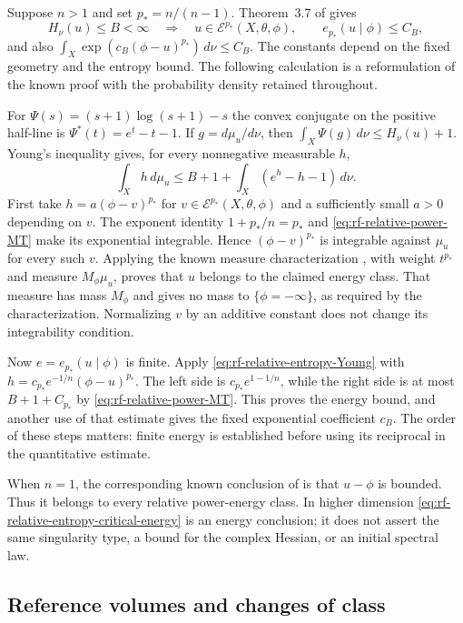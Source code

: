 Suppose $n>1$ and set $p_*=n/(n-1)$.
Theorem~3.7 of \cite{DNTT24EntropyPublished} gives
\[
\tag{65.69}\label{eq:rf-relative-entropy-critical-energy}
 H_\nu(u)\leq B<\infty
 \quad\Longrightarrow\quad
 u\in\mathcal E^{p_*}(X,\theta,\phi),
 \qquad e_{p_*}(u\mid\phi)\leq C_B,
\]
and also
$\int_X\exp(c_B(\phi-u)^{p_*})\,d\nu\leq C_B$.
The constants depend on the fixed geometry and the entropy bound.
The following calculation is a reformulation of the known proof with
the probability density retained throughout.

For
$\Psi(s)=(s+1)\log(s+1)-s$ the convex conjugate on the positive
half-line is $\Psi^*(t)=e^t-t-1$.
If $g=d\mu_u/d\nu$, then
$\int_X\Psi(g)\,d\nu\leq H_\nu(u)+1$.
Young's inequality gives, for every nonnegative measurable $h$,
\[
\tag{65.70}\label{eq:rf-relative-entropy-Young}
 \int_Xh\,d\mu_u
       \leq B+1+\int_X(e^h-h-1)\,d\nu.
\]
First take $h=a(\phi-v)^{p_*}$ for
$v\in\mathcal E^{p_*}(X,\theta,\phi)$ and a sufficiently small
$a>0$ depending on $v$. The exponent identity
$1+p_*/n=p_*$ and \eqref{eq:rf-relative-power-MT} make its exponential
integrable. Hence $(\phi-v)^{p_*}$ is integrable against $\mu_u$ for
every such $v$. Applying the known measure characterization
\cite[Theorem~1.4]{DDL23RelativeV2}, with weight $t^{p_*}$ and measure
$M_\phi\mu_u$, proves that $u$ belongs to the claimed energy class.
That measure has mass $M_\phi$ and gives no mass to $\{\phi=-\infty\}$,
as required by the characterization. Normalizing $v$ by an additive
constant does not change its integrability condition.

Now $e=e_{p_*}(u\mid\phi)$ is finite. Apply
\eqref{eq:rf-relative-entropy-Young} with
$h=c_{p_*}e^{-1/n}(\phi-u)^{p_*}$. The left side is
$c_{p_*}e^{1-1/n}$, while the right side is at most
$B+1+C_{p_*}$ by \eqref{eq:rf-relative-power-MT}.
This proves the energy bound, and another use of that estimate gives
the fixed exponential coefficient $c_B$.
The order of these steps matters: finite energy is established before
using its reciprocal in the quantitative estimate.

When $n=1$, the corresponding known conclusion of
\cite[Theorem~3.7 and Lemma~3.8]{DNTT24EntropyPublished} is that
$u-\phi$ is bounded. Thus it belongs to every relative power-energy
class. In higher dimension \eqref{eq:rf-relative-entropy-critical-energy}
is an energy conclusion; it does not assert the same singularity type,
a bound for the complex Hessian, or an initial spectral law.

\subsection{Reference volumes and changes of class}
\label{sec:rf-relative-entropy-changes}


